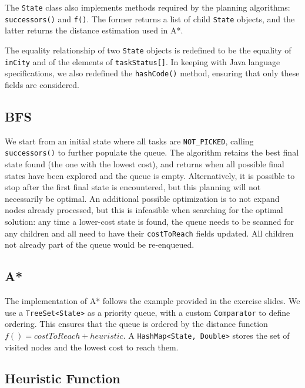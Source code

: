 \documentclass[11pt]{article}
\begin{document}
The \verb|State| class also implements methods required by the planning algorithms:
\verb|successors()| and \verb|f()|. The former returns a list of child
\verb|State| objects, and the latter returns the distance estimation used in A*.

The equality relationship of two \verb|State| objects is redefined to be the
equality of \verb|inCity| and of the elements of \verb|taskStatus[]|. In keeping
with Java language specifications, we also redefined the \verb|hashCode()|
method, ensuring that only these fields are considered.

\subsection{BFS}

We start from an initial state where all tasks are \verb|NOT_PICKED|, calling
\verb|successors()| to further populate the queue. The algorithm retains the
best final state found (the one with the lowest cost), and returns when all
possible final states have been explored and the queue is empty. Alternatively,
it is possible to stop after the first final state is encountered, but this
planning will not necessarily be optimal. An additional possible optimization is
to not expand nodes already processed, but this is infeasible when searching for
the optimal solution: any time a lower-cost state is found, the queue needs to
be scanned for any children and all need to have their \verb|costToReach| fields
updated. All children not already part of the queue would be re-enqueued.

\subsection{A*}
The implementation of A* follows the example provided in the exercise slides.
We use a \verb|TreeSet<State>| as a priority queue, with a custom
\verb|Comparator| to define ordering. This ensures that the queue is ordered by
the distance function $f() = costToReach + heuristic$. A \verb|HashMap<State, Double>|
stores the set of visited nodes and the lowest cost to reach them.



\subsection{Heuristic Function}
\end{document}
